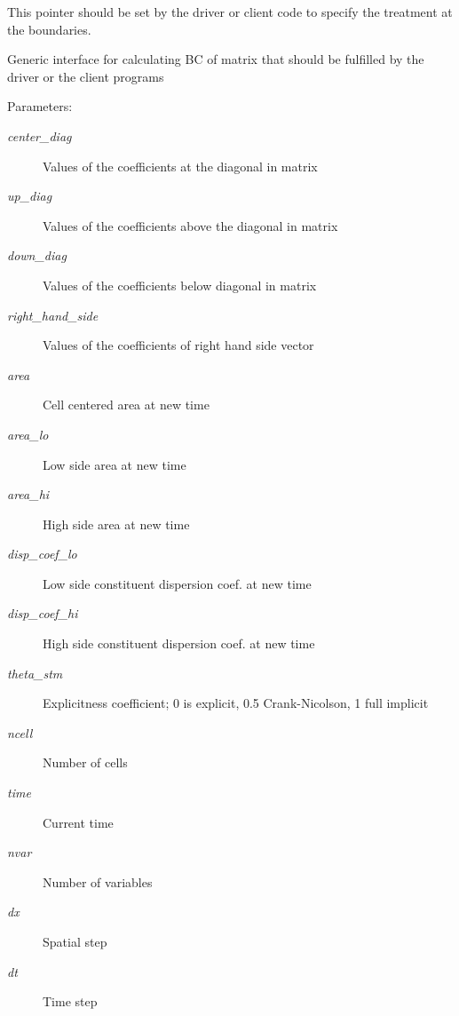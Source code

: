 This pointer should be set by the driver or client code to specify the treatment at the boundaries. 

Generic interface for calculating BC of matrix that should be fulfilled by the driver or the client programs \begin{Desc}
\item[Parameters:]
\begin{description}
\item[{\em center\_\-diag}]Values of the coefficients at the diagonal in matrix\item[{\em up\_\-diag}]Values of the coefficients above the diagonal in matrix\item[{\em down\_\-diag}]Values of the coefficients below diagonal in matrix\item[{\em right\_\-hand\_\-side}]Values of the coefficients of right hand side vector\item[{\em area}]Cell centered area at new time \item[{\em area\_\-lo}]Low side area at new time\item[{\em area\_\-hi}]High side area at new time \item[{\em disp\_\-coef\_\-lo}]Low side constituent dispersion coef. at new time\item[{\em disp\_\-coef\_\-hi}]High side constituent dispersion coef. at new time\item[{\em theta\_\-stm}]Explicitness coefficient; 0 is explicit, 0.5 Crank-Nicolson, 1 full implicit \item[{\em ncell}]Number of cells\item[{\em time}]Current time\item[{\em nvar}]Number of variables\item[{\em dx}]Spatial step \item[{\em dt}]Time step \end{description}
\end{Desc}
